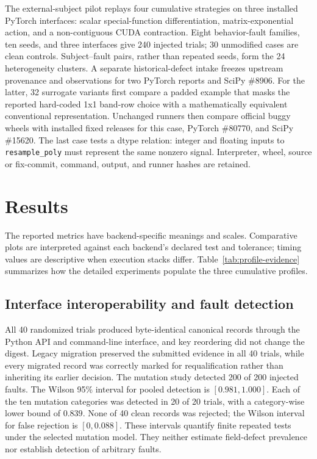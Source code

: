 \documentclass[preprint,12pt,authoryear]{elsarticle}
\begin{document}
The external-subject pilot replays four cumulative strategies on three installed PyTorch interfaces: scalar special-function differentiation, matrix-exponential action, and a non-contiguous CUDA contraction. Eight behavior-fault families, ten seeds, and three interfaces give 240 injected trials; 30 unmodified cases are clean controls. Subject--fault pairs, rather than repeated seeds, form the 24 heterogeneity clusters. A separate historical-defect intake freezes upstream provenance and observations for two PyTorch reports and SciPy \#8906. For the latter, 32 surrogate variants first compare a padded example that masks the reported hard-coded 1x1 band-row choice with a mathematically equivalent conventional representation. Unchanged runners then compare official buggy wheels with installed fixed releases for this case, PyTorch \#80770, and SciPy \#15620. The last case tests a dtype relation: integer and floating inputs to \texttt{resample\_poly} must represent the same nonzero signal. Interpreter, wheel, source or fix-commit, command, output, and runner hashes are retained.

\section{Results}
The reported metrics have backend-specific meanings and scales. Comparative plots are interpreted against each backend's declared test and tolerance; timing values are descriptive when execution stacks differ. Table~\ref{tab:profile-evidence} summarizes how the detailed experiments populate the three cumulative profiles.
\subsection{Interface interoperability and fault detection}
All 40 randomized trials produced byte-identical canonical records through the Python API and command-line interface, and key reordering did not change the digest. Legacy migration preserved the submitted evidence in all 40 trials, while every migrated record was correctly marked for requalification rather than inheriting its earlier decision. The mutation study detected 200 of 200 injected faults. The Wilson 95\% interval for pooled detection is $[0.981,1.000]$. Each of the ten mutation categories was detected in 20 of 20 trials, with a category-wise lower bound of $0.839$. None of 40 clean records was rejected; the Wilson interval for false rejection is $[0,0.088]$. These intervals quantify finite repeated tests under the selected mutation model. They neither estimate field-defect prevalence nor establish detection of arbitrary faults.
\end{document}
